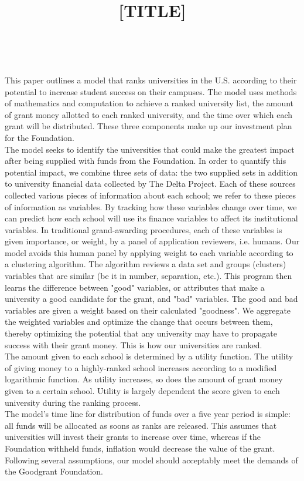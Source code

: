 \documentclass[11pt, reqno]{amsart}
\title{[TITLE]}
\begin{document}
	\thispagestyle{empty}
	
	\ \vspace{8.6cm}
	
		This paper outlines a model that ranks universities in the U.S. according to their potential to increase student success on their campuses. The model uses methods of mathematics and computation to achieve a ranked university list, the amount of grant money allotted to each ranked university, and the time over which each grant will be distributed. These three components make up our investment plan for the Foundation.
		\\     
		The model seeks to identify the universities that could make the greatest impact after being supplied with funds from the Foundation. In order to quantify this potential impact, we combine three sets of data: the two supplied sets in addition to university financial data collected by The Delta Project. Each of these sources collected various pieces of information about each school; we refer to these pieces of information as variables. By tracking how these variables change over time, we can predict how each school will use its finance variables to affect its institutional variables. In traditional grand-awarding procedures, each of these variables is given importance, or weight, by a panel of application reviewers, i.e. humans. Our model avoids this human panel by applying weight to each variable according to a clustering algorithm. The algorithm reviews a data set and groups (clusters) variables that are similar (be it in number, separation, etc.). This program then learns the difference between "good" variables, or attributes that make a university a good candidate for the grant, and "bad" variables. The good and bad variables are given a weight based on their calculated "goodness". We aggregate the weighted variables and optimize the change that occurs between them, thereby optimizing the potential that any university may have to propagate success with their grant money. This is how our universities are ranked.
		\\     
		The amount given to each school is determined by a utility function. The utility of giving money to a highly-ranked school increases according to a modified logarithmic function. As utility increases, so does the amount of grant money given to a certain school. Utility is largely dependent the score given to each university during the ranking process. 
		\\     
		The model's time line for distribution of funds over a five year period is simple: all funds will be allocated as soons as ranks are released. This assumes that universities will invest their grants to increase over time, whereas if the Foundation withheld funds, inflation would decrease the value of the grant. 
		\\     
		Following several assumptions, our model should acceptably meet the demands of the Goodgrant Foundation.
	
\end{document}
